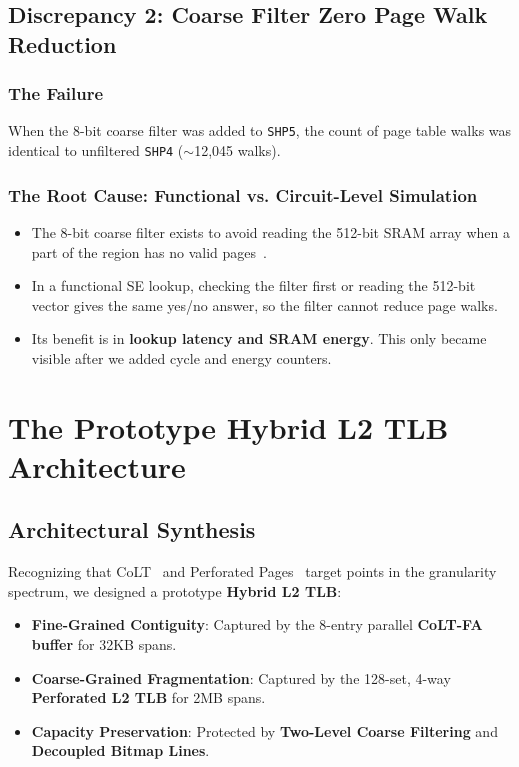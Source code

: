 \subsection{Discrepancy 2: Coarse Filter Zero Page Walk Reduction}
\subsubsection{The Failure}
When the 8-bit coarse filter was added to \texttt{SHP5}, the count of page table walks was identical to unfiltered \texttt{SHP4} ($\sim$12,045 walks).

\subsubsection{The Root Cause: Functional vs. Circuit-Level Simulation}
\begin{itemize}
    \item The 8-bit coarse filter exists to avoid reading the 512-bit SRAM array when a part of the region has no valid pages~\cite{kwon2020perforated}.
    \item In a functional SE lookup, checking the filter first or reading the 512-bit vector gives the same yes/no answer, so the filter cannot reduce page walks.
    \item Its benefit is in \textbf{lookup latency and SRAM energy}. This only became visible after we added cycle and energy counters.
\end{itemize}

\section{The Prototype Hybrid L2 TLB Architecture}

\subsection{Architectural Synthesis}
Recognizing that CoLT~\cite{pham2012colt} and Perforated Pages~\cite{kwon2020perforated} target points in the granularity spectrum, we designed a prototype \textbf{Hybrid L2 TLB}:
\begin{itemize}
    \item \textbf{Fine-Grained Contiguity}: Captured by the 8-entry parallel \textbf{CoLT-FA buffer} for 32KB spans.
    \item \textbf{Coarse-Grained Fragmentation}: Captured by the 128-set, 4-way \textbf{Perforated L2 TLB} for 2MB spans.
    \item \textbf{Capacity Preservation}: Protected by \textbf{Two-Level Coarse Filtering} and \textbf{Decoupled Bitmap Lines}.
\end{itemize}

